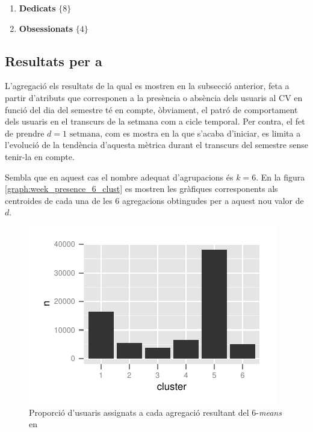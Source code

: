 \documentclass[
	a4paper,
	twoside,
	justified
]{tufte-book}
\begin{document}
\begin{enumerate}[A.]
\begin{enumerate}[a.]
		\begin{enumerate}
		\item \textbf{Dedicats} $\{8\}$
		\item \textbf{Obsessionats} $\{4\}$ 
		\end{enumerate} 	
	\end{enumerate}

\end{enumerate} 

\subsection{Resultats per a \emph{}}

L'agregació els resultats de la qual es mostren en la subsecció anterior, feta a partir d'atributs que corresponen a la presència o absència dels usuaris al CV en funció del dia del semestre té en compte, òbviament, el patró de comportament dels usuaris en el transcurs de la setmana com a cicle temporal. Per contra, el fet de prendre $d = \text{1 setmana}$, com es mostra en la que s'acaba d'iniciar, es limita a l'evolució de la tendència d'aquesta mètrica durant el transcurs del semestre sense tenir-la en compte. 

Sembla que en aquest cas el nombre adequat d'agrupacions és $k = 6$. En la figura \ref{graph:week_presence_6_clust} es mostren les gràfiques corresponents als centroides de cada una de les 6 agregacions obtingudes per a aquest nou valor de $d$.    

\begin{figure}
\begin{center}
\includegraphics{week_user_presence_6means_clusts}
\caption{
\label{graph:week_user_presence_6means_clusts}
	Proporció d'usuaris assignats a cada agregació resultant del 6-\emph{means} en  
}
\end{center}
\end{figure}
\end{document}
